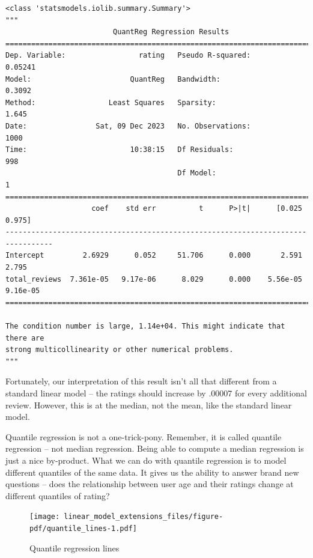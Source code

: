 \documentclass[
  letterpaper,
]{krantz}
\begin{document}
\begin{verbatim}
<class 'statsmodels.iolib.summary.Summary'>
"""
                         QuantReg Regression Results                          
==============================================================================
Dep. Variable:                 rating   Pseudo R-squared:              0.05241
Model:                       QuantReg   Bandwidth:                      0.3092
Method:                 Least Squares   Sparsity:                        1.645
Date:                Sat, 09 Dec 2023   No. Observations:                 1000
Time:                        10:38:15   Df Residuals:                      998
                                        Df Model:                            1
=================================================================================
                    coef    std err          t      P>|t|      [0.025      0.975]
---------------------------------------------------------------------------------
Intercept         2.6929      0.052     51.706      0.000       2.591       2.795
total_reviews  7.361e-05   9.17e-06      8.029      0.000    5.56e-05    9.16e-05
=================================================================================

The condition number is large, 1.14e+04. This might indicate that there are
strong multicollinearity or other numerical problems.
"""
\end{verbatim}

Fortunately, our interpretation of this result isn't all that different
from a standard linear model -- the ratings should increase by .00007
for every additional review. However, this is at the median, not the
mean, like the standard linear model.

Quantile regression is not a one-trick-pony. Remember, it is called
quantile regression -- not median regression. Being able to compute a
median regression is just a nice by-product. What we can do with
quantile regression is to model different quantiles of the same data. It
gives us the ability to answer brand new questions -- does the
relationship between user age and their ratings change at different
quantiles of rating?

\begin{figure}

{\centering \texttt{[image: linear\_model\_extensions\_files/figure-pdf/quantile\_lines-1.pdf]}

}

\caption{Quantile regression lines}

\end{figure}
\end{document}
